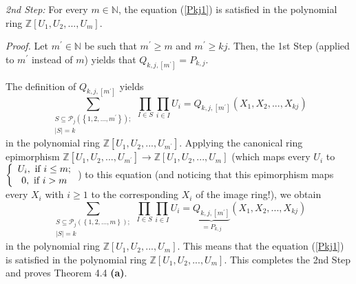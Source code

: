 \documentclass[numbers=enddot,12pt,final,onecolumn,notitlepage]{scrartcl}%
\begin{document}
\textit{2nd Step:} For every $m\in\mathbb{N}$, the equation (\ref{Pkj1}) is
satisfied in the polynomial ring $\mathbb{Z}\left[  U_{1},U_{2},...,U_{m}%
\right]  $.

\textit{Proof.} Let $m^{\prime}\in\mathbb{N}$ be such that $m^{\prime}\geq m$
and $m^{\prime}\geq kj$. Then, the 1st Step (applied to $m^{\prime}$ instead
of $m$) yields that $Q_{k,j,\left[  m^{\prime}\right]  }=P_{k,j}.$

The definition of $Q_{k,j,\left[  m^{\prime}\right]  }$ yields
\[
\sum_{\substack{S\subseteq\mathcal{P}_{j}\left(  \left\{  1,2,...,m^{\prime
}\right\}  \right)  ;\\\left\vert S\right\vert =k}}\prod_{I\in S}\prod_{i\in
I}U_{i}=Q_{k,j,\left[  m^{\prime}\right]  }\left(  X_{1},X_{2},...,X_{kj}%
\right)
\]
in the polynomial ring $\mathbb{Z}\left[  U_{1},U_{2},...,U_{m^{\prime}%
}\right]  $. Applying the canonical ring epimorphism $\mathbb{Z}\left[
U_{1},U_{2},...,U_{m^{\prime}}\right]  \rightarrow\mathbb{Z}\left[
U_{1},U_{2},...,U_{m}\right]  $ (which maps every $U_{i}$ to $\left\{
\begin{array}
[c]{c}%
U_{i},\text{ if }i\leq m;\\
0,\text{ if }i>m
\end{array}
\right.  $) to this equation (and noticing that this epimorphism maps every
$X_{i}$ with $i\geq1$ to the corresponding $X_{i}$ of the image ring!), we
obtain%
\[
\sum_{\substack{S\subseteq\mathcal{P}_{j}\left(  \left\{  1,2,...,m\right\}
\right)  ;\\\left\vert S\right\vert =k}}\prod_{I\in S}\prod_{i\in I}%
U_{i}=\underbrace{Q_{k,j,\left[  m^{\prime}\right]  }}_{=P_{k,j}}\left(
X_{1},X_{2},...,X_{kj}\right)
\]
in the polynomial ring $\mathbb{Z}\left[  U_{1},U_{2},...,U_{m}\right]  .$
This means that the equation (\ref{Pkj1}) is satisfied in the polynomial ring
$\mathbb{Z}\left[  U_{1},U_{2},...,U_{m}\right]  .$ This completes the 2nd
Step and proves Theorem 4.4 \textbf{(a)}.
\end{document}

